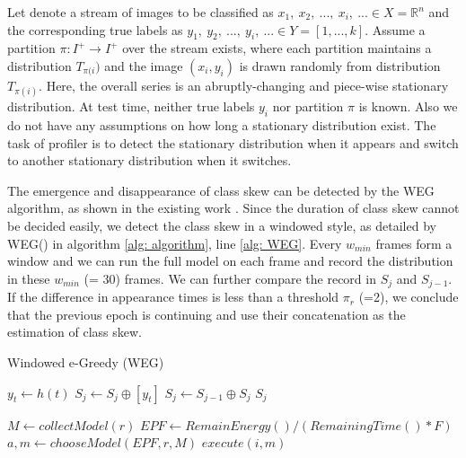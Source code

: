 \documentclass[pageno]{jpaper}
\begin{document}
Let denote a stream of images to be classified as $x_1, \: x_2, \: ...,\: x_i, \: ... \in X = \mathbb{R}^n$ and the corresponding true labels as $y_1, \:y_2, \:...,\:y_i, \:... \in Y = [1, ..., k]$. Assume a partition $\pi: I^+ \rightarrow I^+$ over the stream exists, where each partition maintains a distribution $T_{\pi(i})$ and the image $(x_i, y_i)$ is drawn randomly from distribution $T_{\pi(i)}$. Here, the overall series is an abruptly-changing and piece-wise stationary distribution. At test time, neither true labels $y_i$ nor partition $\pi$ is known. Also we do not have any assumptions on how long a stationary distribution exist. The task of profiler is to detect the stationary distribution when it appears and switch to another stationary distribution when it switches.

The emergence and disappearance of class skew can be detected by the WEG algorithm, as shown in the existing work \cite{shen2016fast}. Since the duration of class skew cannot be decided easily, we detect the class skew in a windowed style, as detailed by WEG() in algorithm \ref{alg: algorithm}, line \ref{alg: WEG}. Every $w_{min}$ frames form a window and we can run the full model on each frame and record the distribution in these $w_{min}$ (= 30) frames. We can further compare the record in $S_j$ and $S_{j-1}$. If the difference in appearance times is less than a threshold $\pi_r$ (=2), we conclude that the previous epoch is continuing and use their concatenation as the estimation of class skew. 



\begin{algorithm} 
 \small
 \caption{Windowed e-Greedy (WEG)}
  \begin{algorithmic}[1]
     \label{alg: WEG}
            \State $y_t \leftarrow h(t)$
            \State $S_j \leftarrow S_j \oplus [y_t]$
        \EndFor
            \State $S_j \leftarrow S_{j-1} \oplus S_j$
        \EndIf
        \State \Return $S_j$
    \EndFunction
  
       \label{alg: scheduler}
        \State $M \leftarrow collectModel(r)$
        \State $EPF \leftarrow RemainEnergy() / (RemainingTime() \ast F) $
        \State $a, m \leftarrow chooseModel(EPF, r, M)$  
        \State $execute(i,m)$        
    \EndFunction
\end{algorithmic}
 \label{alg: algorithm}

\end{algorithm}
\end{document}
